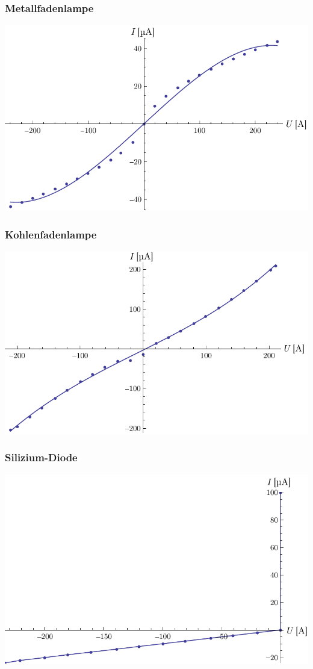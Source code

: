 \documentclass[12pt,a4paper]{article}
\begin{document}
\subsubsection*{Metallfadenlampe}
\includegraphics[width=15cm]{metallfadenlampe.pdf}

\subsubsection*{Kohlenfadenlampe}
\includegraphics[width=15cm]{kohlenfadenlampe.pdf}

\subsubsection*{Silizium-Diode}
\includegraphics[width=15cm]{siliziumdiode.pdf}
\end{document}
